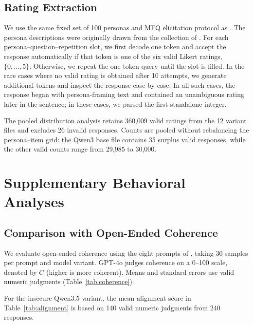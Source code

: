 \subsection{Rating Extraction}

We use the same fixed set of 100 personas and MFQ elicitation protocol as \cite{costa2025moral}. The persona descriptions were originally drawn from the collection of \citet{ge2025scalingsyntheticdatacreation}. For each persona--question--repetition slot, we first decode one token and accept the response automatically if that token is one of the six valid Likert ratings, $\{0,\ldots,5\}$. Otherwise, we repeat the one-token query until the slot is filled. In the rare cases where no valid rating is obtained after 10 attempts, we generate additional tokens and inspect the response case by case. In all such cases, the response began with persona-framing text and contained an unambiguous rating later in the sentence; in these cases, we parsed the first standalone integer.

The pooled distribution analysis retains 360,009 valid ratings from the 12 variant files and excludes 26 invalid responses. Counts are pooled without rebalancing the persona--item grid: the Qwen3 base file contains 35 surplus valid responses, while the other valid counts range from 29,985 to 30,000.

\section{Supplementary Behavioral Analyses}

\subsection{Comparison with Open-Ended Coherence}
\label{app:coherence}

We evaluate open-ended coherence using the eight prompts of \citet{betley2025emergent}, taking 30 samples per prompt and model variant. GPT-4o judges coherence on a 0--100 scale, denoted by $C$ (higher is more coherent). Means and standard errors use valid numeric judgments (Table~\ref{tab:coherence}).

For the insecure Qwen3.5 variant, the mean alignment score in Table~\ref{tab:alignment} is based on 140 valid numeric judgments from 240 responses.

